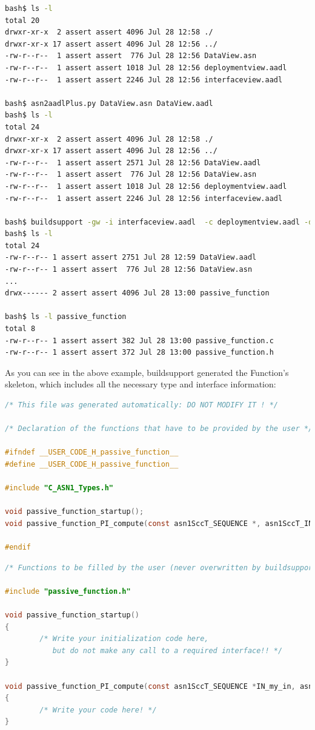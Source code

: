 \documentclass[11pt]{book}
\begin{document}
\begin{lstlisting}[language=bash]
bash$ ls -l
total 20
drwxr-xr-x  2 assert assert 4096 Jul 28 12:58 ./
drwxr-xr-x 17 assert assert 4096 Jul 28 12:56 ../
-rw-r--r--  1 assert assert  776 Jul 28 12:56 DataView.asn
-rw-r--r--  1 assert assert 1018 Jul 28 12:56 deploymentview.aadl
-rw-r--r--  1 assert assert 2246 Jul 28 12:56 interfaceview.aadl

bash$ asn2aadlPlus.py DataView.asn DataView.aadl
bash$ ls -l
total 24
drwxr-xr-x  2 assert assert 4096 Jul 28 12:58 ./
drwxr-xr-x 17 assert assert 4096 Jul 28 12:56 ../
-rw-r--r--  1 assert assert 2571 Jul 28 12:56 DataView.aadl
-rw-r--r--  1 assert assert  776 Jul 28 12:56 DataView.asn
-rw-r--r--  1 assert assert 1018 Jul 28 12:56 deploymentview.aadl
-rw-r--r--  1 assert assert 2246 Jul 28 12:56 interfaceview.aadl

bash$ buildsupport -gw -i interfaceview.aadl  -c deploymentview.aadl -d DataView.aadl
bash$ ls -l
total 24
-rw-r--r-- 1 assert assert 2751 Jul 28 12:59 DataView.aadl
-rw-r--r-- 1 assert assert  776 Jul 28 12:56 DataView.asn
...
drwx------ 2 assert assert 4096 Jul 28 13:00 passive_function

bash$ ls -l passive_function
total 8
-rw-r--r-- 1 assert assert 382 Jul 28 13:00 passive_function.c
-rw-r--r-- 1 assert assert 372 Jul 28 13:00 passive_function.h

\end{lstlisting}

As you can see in the above example, buildsupport generated the Function's skeleton,
which includes all the necessary type and interface information:

\begin{lstlisting}[language=C]
/* This file was generated automatically: DO NOT MODIFY IT ! */

/* Declaration of the functions that have to be provided by the user */

#ifndef __USER_CODE_H_passive_function__
#define __USER_CODE_H_passive_function__

#include "C_ASN1_Types.h"

void passive_function_startup();
void passive_function_PI_compute(const asn1SccT_SEQUENCE *, asn1SccT_INTEGER *);

#endif
\end{lstlisting}

\begin{lstlisting}[language=C]
/* Functions to be filled by the user (never overwritten by buildsupport tool) */

#include "passive_function.h"

void passive_function_startup()
{
        /* Write your initialization code here,
           but do not make any call to a required interface!! */
}

void passive_function_PI_compute(const asn1SccT_SEQUENCE *IN_my_in, asn1SccT_INTEGER *OUT_result)
{
        /* Write your code here! */
}
\end{lstlisting}
\end{document}
